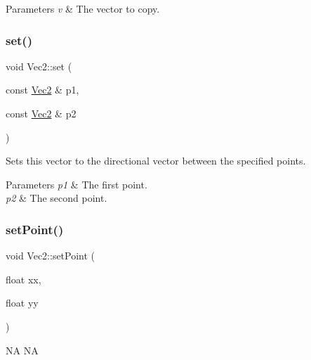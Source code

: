\begin{DoxyParams}{Parameters}
{\em v} & The vector to copy. \\
\hline
\end{DoxyParams}
\mbox{\label{classVec2_a4e76b9c6df8c81a4035107961d670caf}} 
\subsubsection{\texorpdfstring{set()}{set()}\hspace{0.1cm}{\footnotesize\ttfamily [8/8]}}
{\footnotesize\ttfamily void Vec2\+::set (\begin{DoxyParamCaption}\item[{const \hyperlink{classVec2}{Vec2} \&}]{p1,  }\item[{const \hyperlink{classVec2}{Vec2} \&}]{p2 }\end{DoxyParamCaption})\hspace{0.3cm}{\ttfamily [inline]}}

Sets this vector to the directional vector between the specified points.


\begin{DoxyParams}{Parameters}
{\em p1} & The first point. \\
\hline
{\em p2} & The second point. \\
\hline
\end{DoxyParams}
\mbox{\label{classVec2_a3bfb9fcb76dde6c03534f94906bb33fc}} 
\subsubsection{\texorpdfstring{set\+Point()}{setPoint()}\hspace{0.1cm}{\footnotesize\ttfamily [1/2]}}
{\footnotesize\ttfamily void Vec2\+::set\+Point (\begin{DoxyParamCaption}\item[{float}]{xx,  }\item[{float}]{yy }\end{DoxyParamCaption})\hspace{0.3cm}{\ttfamily [inline]}}

NA  NA \mbox{\label{classVec2_a3bfb9fcb76dde6c03534f94906bb33fc}} 
